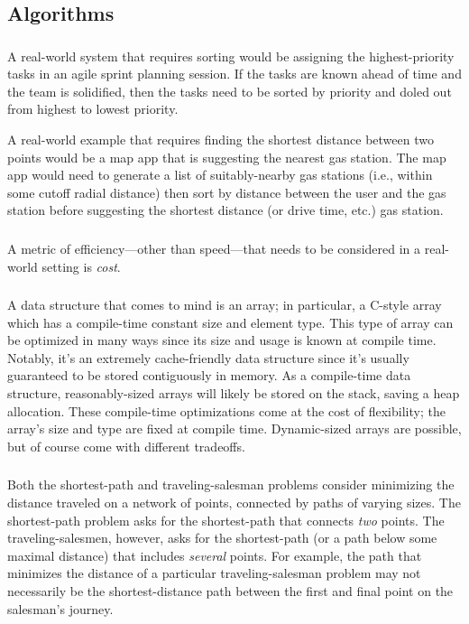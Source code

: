 \subsection{Algorithms}

\subsubsection{}
    A real-world system that requires sorting would be assigning the highest-priority tasks in an agile sprint planning session.  If the tasks are known ahead of time and the team is solidified, then the tasks need to be sorted by priority and doled out from highest to lowest priority.

    A real-world example that requires finding the shortest distance between two points would be a map app that is suggesting the nearest gas station.  The map app would need to generate a list of suitably-nearby gas stations (i.e., within some cutoff radial distance) then sort by distance between the user and the gas station before suggesting the shortest distance (or drive time, etc.) gas station.

\subsubsection{}
    A metric of efficiency---other than speed---that needs to be considered in a real-world setting is {\it cost}.

\subsubsection{}
    A data structure that comes to mind is an array; in particular, a C-style array which has a compile-time constant size and element type.  This type of array can be optimized in many ways since its size and usage is known at compile time.  Notably, it's an extremely cache-friendly data structure since it's usually guaranteed to be stored contiguously in memory.  As a compile-time data structure, reasonably-sized arrays will likely be stored on the stack, saving a heap allocation.  These compile-time optimizations come at the cost of flexibility; the array's size and type are fixed at compile time.  Dynamic-sized arrays are possible, but of course come with different tradeoffs.

\subsubsection{}
    Both the shortest-path and traveling-salesman problems consider minimizing the distance traveled on a network of points, connected by paths of varying sizes.  The shortest-path problem asks for the shortest-path that connects {\it two} points.  The traveling-salesmen, however, asks for the shortest-path (or a path below some maximal distance) that includes {\it several} points.  For example, the path that minimizes the distance of a particular traveling-salesman problem may not necessarily be the shortest-distance path between the first and final point on the salesman's journey.

